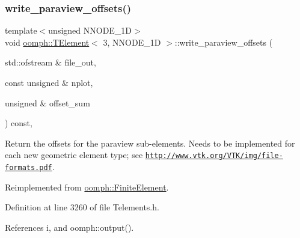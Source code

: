 \subsubsection{\texorpdfstring{write\+\_\+paraview\+\_\+offsets()}{write\_paraview\_offsets()}}
{\footnotesize\ttfamily template$<$unsigned N\+N\+O\+D\+E\+\_\+1D$>$ \\
void \hyperlink{classoomph_1_1TElement}{oomph\+::\+T\+Element}$<$ 3, N\+N\+O\+D\+E\+\_\+1D $>$\+::write\+\_\+paraview\+\_\+offsets (\begin{DoxyParamCaption}\item[{std\+::ofstream \&}]{file\+\_\+out,  }\item[{const unsigned \&}]{nplot,  }\item[{unsigned \&}]{offset\+\_\+sum }\end{DoxyParamCaption}) const\hspace{0.3cm}{\ttfamily [inline]}, {\ttfamily [virtual]}}



Return the offsets for the paraview sub-\/elements. Needs to be implemented for each new geometric element type; see \href{http://www.vtk.org/VTK/img/file-formats.pdf}{\tt http\+://www.\+vtk.\+org/\+V\+T\+K/img/file-\/formats.\+pdf}. 



Reimplemented from \hyperlink{classoomph_1_1FiniteElement_af11d35779224185e6693f2db450cc111}{oomph\+::\+Finite\+Element}.



Definition at line 3260 of file Telements.\+h.



References i, and oomph\+::output().

\mbox{\label{classoomph_1_1TElement_3_013_00_01NNODE__1D_01_4_a897752cdeaa4920ea6d78aaad0b02919}} 
